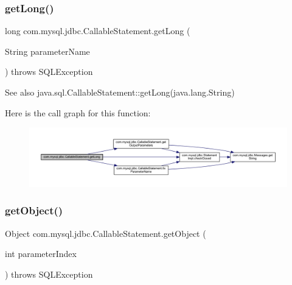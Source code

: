 \subsubsection{\texorpdfstring{get\+Long()}{getLong()}\hspace{0.1cm}{\footnotesize\ttfamily [2/2]}}
{\footnotesize\ttfamily long com.\+mysql.\+jdbc.\+Callable\+Statement.\+get\+Long (\begin{DoxyParamCaption}\item[{String}]{parameter\+Name }\end{DoxyParamCaption}) throws S\+Q\+L\+Exception}

\begin{DoxySeeAlso}{See also}
java.\+sql.\+Callable\+Statement\+::get\+Long(java.\+lang.\+String) 
\end{DoxySeeAlso}
Here is the call graph for this function\+:\nopagebreak
\begin{figure}[H]
\begin{center}
\leavevmode
\includegraphics[width=350pt]{classcom_1_1mysql_1_1jdbc_1_1_callable_statement_a71fe668a8e85c9a07c6f66d80edbff88_cgraph}
\end{center}
\end{figure}
\mbox{\label{classcom_1_1mysql_1_1jdbc_1_1_callable_statement_aab2faed459ce07e17b7c4c6871d7ffb4}} 
\subsubsection{\texorpdfstring{get\+Object()}{getObject()}\hspace{0.1cm}{\footnotesize\ttfamily [1/4]}}
{\footnotesize\ttfamily Object com.\+mysql.\+jdbc.\+Callable\+Statement.\+get\+Object (\begin{DoxyParamCaption}\item[{int}]{parameter\+Index }\end{DoxyParamCaption}) throws S\+Q\+L\+Exception}

